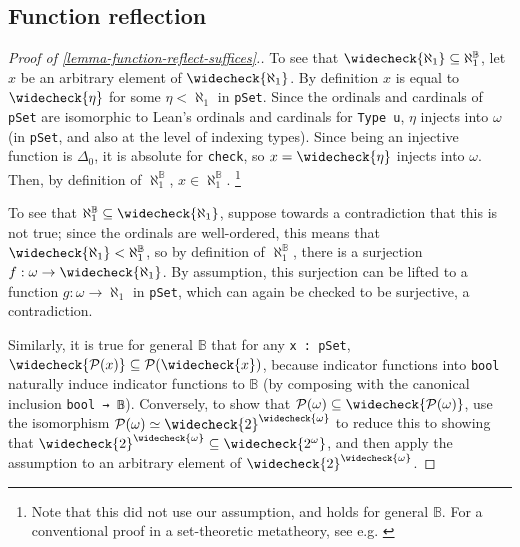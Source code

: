 \documentclass[sigplan,10pt,review, autoref,anonymous]{acmart}
\newcommand{\lil}{\lstinline}
\theoremstyle{definition}
\begin{document}

\subsection{Function reflection} \label{subsect:function-reflection}

\begin{proof}[Proof of \autoref{lemma-function-reflect-suffices}.]

  To see that \(\widecheck{\aleph_1} \subseteq \aleph_1^{\mathbb{B}}\), let \(x\) be an arbitrary element of \(\widecheck{\aleph_1}\). By definition \(x\) is equal to \(\widecheck{\eta}\) for some \(\eta < \aleph_1\) in \lil{pSet}. Since the ordinals and cardinals of \lil{pSet} are isomorphic to Lean's ordinals and cardinals for \lil{Type u}, \(\eta\) injects into \(\omega\) (in \lil{pSet}, and also at the level of indexing types). Since being an injective function is \(\Delta_0\), it is absolute for \lil{check}, so \(x = \widecheck{\eta}\) injects into \(\omega\). Then, by definition of \(\aleph_1^{\mathbb{B}}\), \(x \in \aleph_1^{\mathbb{B}}\). \footnote{Note that this did not use our assumption, and holds for general \(\mathbb{B}\). For a conventional proof in a set-theoretic metatheory, see e.g. \cite{bell2011set}}

  To see that \(\aleph_1^{\mathbb{B}} \subseteq \widecheck{\aleph_1}\), suppose towards a contradiction that this is not true; since the ordinals are well-ordered, this means that \(\widecheck{\aleph_1} < \aleph_1^{\mathbb{B}}\), so by definition of \(\aleph_1^{\mathbb{B}}\), there is a surjection \(f : \omega \to \widecheck{\aleph_1}\). By assumption, this surjection can be lifted to a function \(g : \omega \to \aleph_1\) in \lil{pSet}, which can again be checked to be surjective, a contradiction.

 Similarly, it is true for general \(\mathbb{B}\) that for any \lil{x : pSet}, \(\widecheck{\mathcal{P}(x)} \subseteq \mathcal{P}(\widecheck{x})\), because indicator functions into \lil{bool} naturally induce indicator functions to \(\mathbb{B}\) (by composing with the canonical inclusion \lil{bool → 𝔹}). Conversely, to show that \(\mathcal{P}(\omega) \subseteq \widecheck{\mathcal{P}(\omega)}\), use the isomorphism \(\mathcal{P}(\omega) \simeq \widecheck{2}^{\widecheck{\omega}}\) to reduce this to showing that \(\widecheck{2}^{\widecheck{\omega}} \subseteq \widecheck{2^{\omega}}\), and then apply the assumption to an arbitrary element of \(\widecheck{2}^{\widecheck{\omega}}\).
\end{proof}
\end{document}
